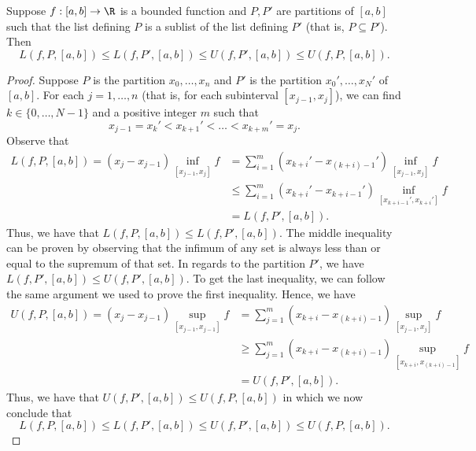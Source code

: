 \begin{prop}\label{Inequalities with Riemann Sums}
    Suppose \( f: [a,b] \to \R  \) is a bounded function and \( P, P' \) are partitions of \( [a,b] \) such that the list defining \( P  \) is a sublist of the list defining \( P' \) (that is, \( P \subseteq  P' \)). Then 
    \[  L(f,P, [a,b]) \leq L(f, P', [a,b]) \leq U(f, P', [a,b]) \leq U(f,P,[a,b]). \]
\end{prop}
\begin{proof}
    Suppose \( P  \) is the partition \( {x}_{0}, \dots, {x}_{n} \) and \( P' \) is the partition \( {x}_{0}', \dots, {x}_{N}' \) of \( [a,b] \). For each \( j = 1, \dots, n \) (that is, for each subinterval \( [{x}_{j-1}, {x}_{j}] \)), we can find \( k \in \{ 0, \dots, N-1 \} \) and a positive integer \( m  \) such that  
    \[  {x}_{j-1} = {x}_{k}' < {x}_{k+1}' < \dots < {x}_{k+m}' = {x}_{j}. \]
    Observe that
    \begin{align*}
        L(f, P, [a,b]) = ({x}_{j} - {x}_{j-1}) \inf_{[{x}_{j-1}, {x}_{j}]} f &= \sum_{ i=1  }^{  m } ({x}_{k+i}' - {x}_{(k+i)-1}') \inf_{[{x}_{j-1}, {x}_{j}]} f \\
                                                            &\leq \sum_{ i=1  }^{ m  } ({x}_{k+i}' - {x}_{k+i - 1}') \inf_{[{x}_{k+i-1}', {x}_{k+i}']}f \\
                                                            &= L(f, P', [a,b]).
\end{align*}
Thus, we have that \( L(f,P, [a,b]) \leq L(f,P', [a,b]) \). The middle inequality can be proven by observing that the infimum of any set is always less than or equal to the supremum of that set. In regards to the partition \( P'  \), we have \( L(f, P', [a,b]) \leq U(f, P', [a,b]) \). To get the last inequality, we can follow the same argument we used to prove the first inequality. Hence, we have  
    \begin{align*}
        U(f,P ,[a,b]) = ({x}_{j} - {x}_{j-1}) \sup_{[{x}_{j-1}, {x}_{j-1}]} f &= \sum_{ j=1  }^{ m  } ({x}_{k+i} - {x}_{(k+i)-1}) \sup_{[{x}_{j-1}, {x}_{j}]} f \\
                                                                              &\geq  \sum_{ j=1  }^{ m  } ({x}_{k+i} - {x}_{(k+i)-1}) \sup_{[{x}_{k+i}, {x}_{(k+i)-1}]} f \\
                                                                              &= U(f,P', [a,b]).
    \end{align*}
    Thus, we have that \( U(f,P', [a,b]) \leq U(f, P, [a,b]) \) in which we now conclude that
    \[  L(f,P, [a,b]) \leq L(f, P', [a,b]) \leq U(f, P', [a,b]) \leq U(f,P,[a,b]). \]
\end{proof}

